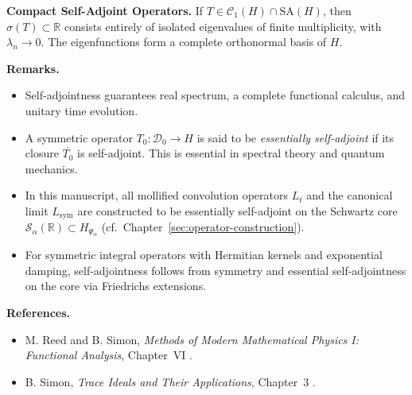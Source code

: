 \begin{definition}
\medskip
\noindent\textbf{Compact Self-Adjoint Operators.}
If \( T \in \mathcal{C}_1(H) \cap \mathrm{SA}(H) \), then \( \sigma(T) \subset \mathbb{R} \) consists entirely of isolated eigenvalues of finite multiplicity, with \( \lambda_n \to 0 \). The eigenfunctions form a complete orthonormal basis of \( H \).

\medskip
\noindent\textbf{Remarks.}
\begin{itemize}
    \item Self-adjointness guarantees real spectrum, a complete functional calculus, and unitary time evolution.
    \item A symmetric operator \( T_0 \colon \mathcal{D}_0 \to H \) is said to be \emph{essentially self-adjoint} if its closure \( \overline{T_0} \) is self-adjoint. This is essential in spectral theory and quantum mechanics.
    \item In this manuscript, all mollified convolution operators \( L_t \) and the canonical limit \( L_{\mathrm{sym}} \) are constructed to be essentially self-adjoint on the Schwartz core \( \mathcal{S}_\alpha(\mathbb{R}) \subset H_{\Psi_\alpha} \) (cf.~Chapter~\ref{sec:operator-construction}).
    \item For symmetric integral operators with Hermitian kernels and exponential damping, self-adjointness follows from symmetry and essential self-adjointness on the core via Friedrichs extensions.
\end{itemize}

\medskip
\noindent\textbf{References.}
\begin{itemize}
    \item M. Reed and B. Simon, \emph{Methods of Modern Mathematical Physics I: Functional Analysis}, Chapter~VI \cite{ReedSimon1980I}.
    \item B. Simon, \emph{Trace Ideals and Their Applications}, Chapter~3 \cite{Simon2005TraceIdeals}.
\end{itemize}
\end{definition}
